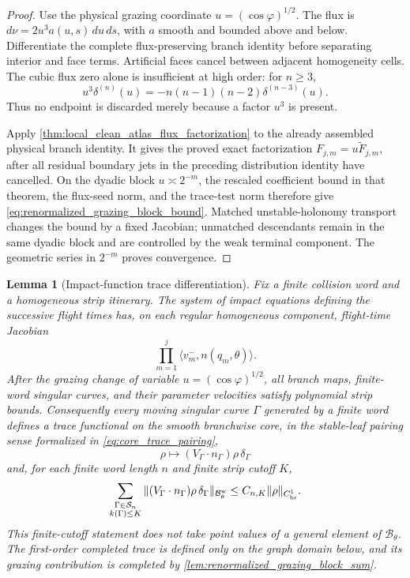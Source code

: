 \documentclass[11pt]{amsart}
\theoremstyle{compactplain}
\newtheorem*{lemma*}{Lemma}
\theoremstyle{compactdefinition}
\theoremstyle{compactremark}
\newcommand{\Bcal}{\mathcal B}
\newcommand{\Bweak}{\mathcal B^{\mathrm w}}
\newcommand{\Ssing}{\mathcal S}
\begin{document}
\begin{proof}
Use the physical grazing coordinate
\(u=(\cos\varphi)^{1/2}\).  The flux is
\(d\nu=2u^3a(u,s)\,du\,ds\), with \(a\) smooth and bounded above and below.
Differentiate the complete flux-preserving branch identity before separating
interior and face terms.  Artificial faces cancel between adjacent
homogeneity cells.  The cubic flux zero alone is insufficient at high order:
for \(n\ge3\),
\[
 u^3\delta^{(n)}(u)
 =-n(n-1)(n-2)\delta^{(n-3)}(u).
\]
Thus no endpoint is discarded merely because a factor \(u^3\) is present.

Apply \cref{thm:local_clean_atlas_flux_factorization} to the already assembled
physical branch identity.  It gives the proved exact factorization
\(F_{j,m}=u\widetilde F_{j,m}\), after all residual boundary
jets in the preceding distribution identity have cancelled.  On the dyadic
block \(u\asymp2^{-m}\), the rescaled coefficient bound in that theorem,
the flux-seed norm, and the trace-test norm therefore give
\eqref{eq:renormalized_grazing_block_bound}.  Matched unstable-holonomy
transport changes the bound by a fixed Jacobian; unmatched descendants remain
in the same dyadic block and are controlled by the weak terminal component.
The geometric series in \(2^{-m}\) proves convergence.
\end{proof}

\begin{lemma*}[Impact-function trace differentiation]
Fix a finite collision word and a homogeneous strip itinerary.  The system of
impact equations defining the successive flight times has, on each regular
homogeneous component, flight-time Jacobian
\begin{equation}
  \prod_{m=1}^{j}\langle v_m^-,n(q_m,\theta)\rangle .
\end{equation}
After the grazing change of variable $u=(\cos\varphi)^{1/2}$, all branch maps,
finite-word singular curves, and their parameter velocities satisfy polynomial
strip bounds.  Consequently every moving singular curve $\Gamma$ generated by a
finite word defines a trace functional on the smooth branchwise core, in the
stable-leaf pairing sense formalized in \cref{eq:core_trace_pairing},
\begin{equation}
  \rho\longmapsto (V_\Gamma\cdot n_\Gamma)\rho\,\delta_\Gamma
\end{equation}
and, for each finite word length $n$ and finite strip cutoff \(K\),
\begin{equation}
  \sum_{\substack{\Gamma\in\Ssing_n\\k(\Gamma)\le K}}
  \|(V_\Gamma\cdot n_\Gamma)\rho\,\delta_\Gamma\|_{\Bweak_\theta}
  \le C_{n,K}\|\rho\|_{C^1_{\rm br}}.
\end{equation}
This finite-cutoff statement does not take point values of a general element of
\(\Bcal_\theta\).  The first-order completed trace is defined only on the graph
domain below, and its grazing contribution is completed by
\cref{lem:renormalized_grazing_block_sum}.
\end{lemma*}
\end{document}
